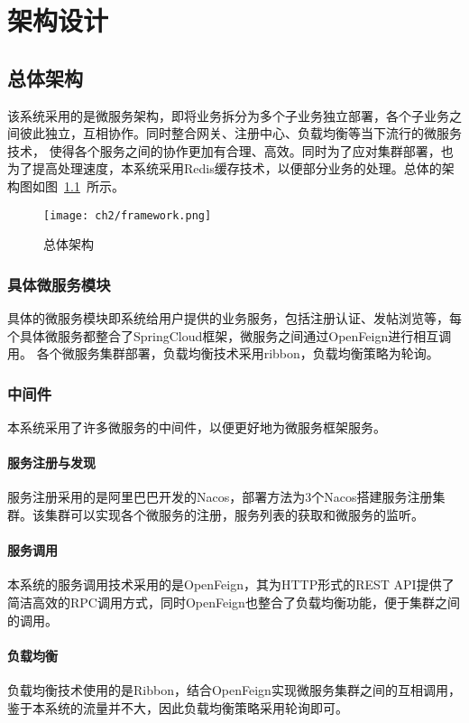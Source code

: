 \chapter{架构设计}

\section{总体架构}
该系统采用的是微服务架构，即将业务拆分为多个子业务独立部署，各个子业务之间彼此独立，互相协作。同时整合网关、注册中心、负载均衡等当下流行的微服务技术，
使得各个服务之间的协作更加有合理、高效。同时为了应对集群部署，也为了提高处理速度，本系统采用Redis缓存技术，以便部分业务的处理。总体的架构图如图~\ref{fig:framework}~所示。
\begin{figure}[htbp]
    \centering
    \texttt{[image: ch2/framework.png]}
    \caption{总体架构}\label{fig:framework}
    \vspace{\baselineskip} %
\end{figure}

\subsection{具体微服务模块}
具体的微服务模块即系统给用户提供的业务服务，包括注册认证、发帖浏览等，每个具体微服务都整合了SpringCloud框架，微服务之间通过OpenFeign进行相互调用。
各个微服务集群部署，负载均衡技术采用ribbon，负载均衡策略为轮询。

\subsection{中间件}
本系统采用了许多微服务的中间件，以便更好地为微服务框架服务。
\subsubsection{服务注册与发现}
服务注册采用的是阿里巴巴开发的Nacos，部署方法为3个Nacos搭建服务注册集群。该集群可以实现各个微服务的注册，服务列表的获取和微服务的监听。
\subsubsection{服务调用}
本系统的服务调用技术采用的是OpenFeign，其为HTTP形式的REST API提供了简洁高效的RPC调用方式，同时OpenFeign也整合了负载均衡功能，便于集群之间的调用。
\subsubsection{负载均衡}
负载均衡技术使用的是Ribbon，结合OpenFeign实现微服务集群之间的互相调用，鉴于本系统的流量并不大，因此负载均衡策略采用轮询即可。
